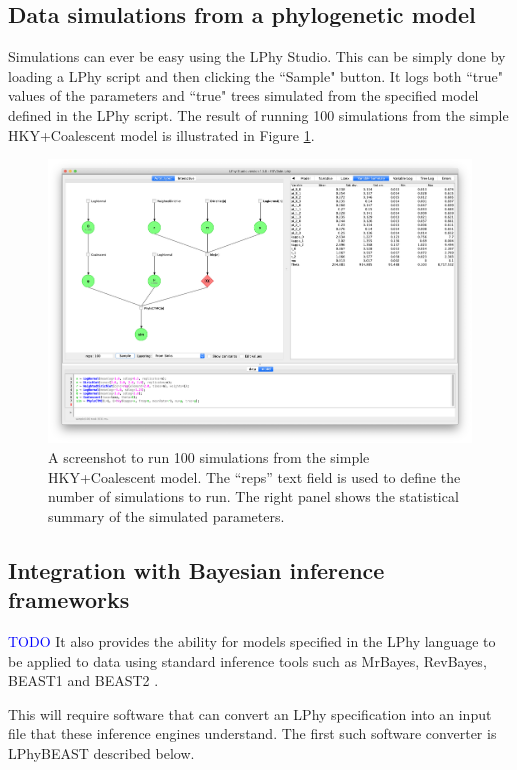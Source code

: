 \documentclass[10pt,letterpaper,table]{article}
\begin{document}
{\subsection{Data simulations from a phylogenetic model}

Simulations can ever be easy using the LPhy Studio. This can be simply done by loading a LPhy script and then clicking the ``Sample" button. 
It logs both ``true" values of the parameters and ``true" trees simulated from the specified model defined in the LPhy script. 
The result of running 100 simulations from the simple HKY+Coalescent model is illustrated in Figure \ref{fig:simulations100}. 

\begin{figure}
  \includegraphics[width=\textwidth]{figs/simulations100.png}
  \caption{A screenshot to run 100 simulations from the simple HKY+Coalescent model. The ``reps'' text field is used to define the number of simulations to run. The right panel shows the statistical summary of the simulated parameters.} 
  \label{fig:simulations100}
\end{figure}


\subsection{Integration with Bayesian inference frameworks}
\textcolor{blue}{TODO}
It also provides the ability for models specified in the LPhy language to be applied to data using standard inference tools
such as MrBayes, RevBayes, BEAST1 and BEAST2
\cite{bouckaert2014beastanalysis,DrummondBouckaert2015,bouckaert2019beastanalysis}.

This will require software that can convert an LPhy specification into
an input file that these inference engines understand.
The first such software converter is LPhyBEAST described below.

}
\end{document}
